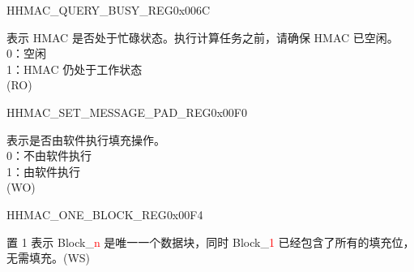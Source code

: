     \begin{register}{H}{HMAC\_QUERY\_BUSY\_REG}{0x006C}\label{regdesc:HMACQUERYBUSYREG}
    \regnewline%
    \begin{regdesc}\begin{reglist}
    \label{fielddesc:HMACBUSYSTATE}\item [HMAC\_BUSY\_STATE] 表示 HMAC 是否处于忙碌状态。执行计算任务之前，请确保 HMAC 已空闲。
    \\0：空闲
    \\1：HMAC 仍处于工作状态
    \\(RO)
    \end{reglist}\end{regdesc}
    \end{register}


    \begin{register}{H}{HMAC\_SET\_MESSAGE\_PAD\_REG}{0x00F0}\label{regdesc:HMACSETMESSAGEPADREG}
    \regnewline%
    \begin{regdesc}\begin{reglist}
    \label{fielddesc:HMACSETTEXTPAD}\item [HMAC\_SET\_TEXT\_PAD] 表示是否由软件执行填充操作。
    \\0：不由软件执行
    \\1：由软件执行 
    \\(WO)
    \end{reglist}\end{regdesc}
    \end{register}


    \begin{register}{H}{HMAC\_ONE\_BLOCK\_REG}{0x00F4}\label{regdesc:HMACONEBLOCKREG}
    \regnewline%
    \begin{regdesc}\begin{reglist}
    \label{fielddesc:HMACSETONEBLOCK}\item [HMAC\_SET\_ONE\_BLOCK] 置 1 表示 Block\_\textcolor{red}{n} 是唯一一个数据块，同时 Block\_\textcolor{red}{1} 已经包含了所有的填充位，无需填充。(WS)
    \end{reglist}\end{regdesc}
    \end{register}


